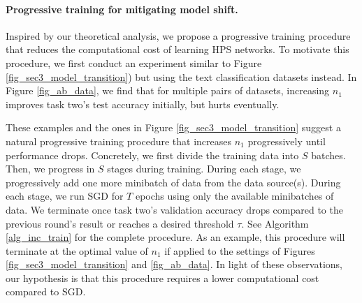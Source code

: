 
\paragraph{Progressive training for mitigating model shift.}
Inspired by our theoretical analysis, we propose a progressive training procedure that reduces the computational cost of learning HPS networks.
To motivate this procedure, we first conduct an experiment similar to Figure \ref{fig_sec3_model_transition}) but using the text classification datasets instead.
In Figure \ref{fig_ab_data}, we find that for multiple pairs of datasets, increasing $n_1$ improves task two's test accuracy initially, but hurts eventually.

These examples and the ones in Figure \ref{fig_sec3_model_transition} suggest a natural progressive training procedure that increases $n_1$ progressively until performance drops.
Concretely, we first divide the training data into $S$ batches.
Then, we progress in $S$ stages during training. During each stage, we progressively add one more minibatch of data from the data source(s).
During each stage, we run SGD for $T$ epochs using only the available minibatches of data.
We terminate once task two's validation accuracy drops compared to the previous round's result or reaches a desired threshold $\tau$.
See Algorithm \ref{alg_inc_train} for the complete procedure.
As an example, this procedure will terminate at the optimal value of $n_1$ if applied to the settings of Figures  \ref{fig_sec3_model_transition} and \ref{fig_ab_data}.
In light of these observations, our hypothesis is that this procedure requires a lower computational cost compared to SGD.

